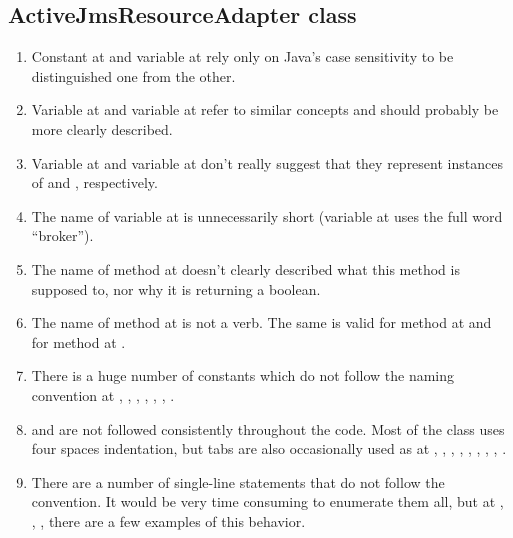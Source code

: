 \subsection{ActiveJmsResourceAdapter class}
\begin{enumerate}
	\item {} Constant  at  and variable  at  rely only on Java's case sensitivity to be distinguished one from the other. 
	\item {} Variable  at  and variable  at  refer to similar concepts and should probably be more clearly described. 
	\item {} Variable  at  and variable  at  don't really suggest that they represent instances of  and , respectively.
	\item {} The name of variable  at  is unnecessarily short (variable  at  uses the full word “broker”). 
	\item {} The name of method  at  doesn't clearly described what this method is supposed to, nor why it is returning a boolean. 
	\item {} The name of method  at  is not a verb. The same is valid for method  at  and for method  at .
	\item {} There is a huge number of constants which do not follow the naming convention at , , , , , , . 
	\item {} and  are not followed consistently throughout the code. Most of the class uses four spaces indentation, but tabs are also occasionally used as at , , , , , , , , . 
	\item {} There are a number of single-line  statements that do not follow the convention. It would be very time consuming to enumerate them all, but at , , ,  there are a few examples of this behavior. 

\end{enumerate}
